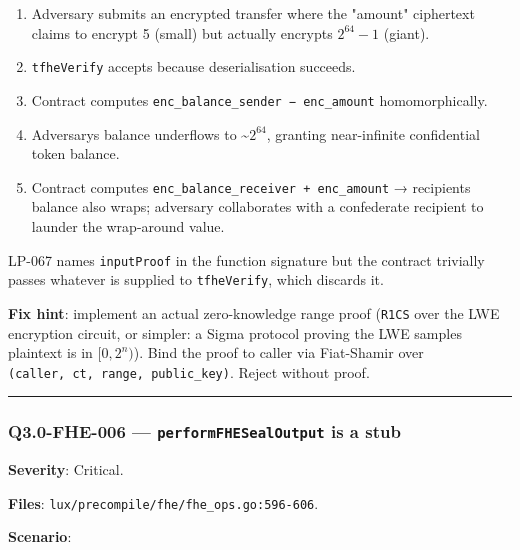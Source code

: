 \documentclass[
]{article}
\providecommand{\tightlist}{%
  \setlength{\itemsep}{0pt}\setlength{\parskip}{0pt}}
\begin{document}
\begin{enumerate}
\def\labelenumi{\arabic{enumi}.}
\tightlist
\item
  Adversary submits an encrypted transfer where the "amount" ciphertext
  claims to encrypt 5 (small) but actually encrypts \(2^{64}-1\)
  (giant).
\item
  \texttt{tfheVerify} accepts because deserialisation succeeds.
\item
  Contract computes \texttt{enc\_balance\_sender\ −\ enc\_amount}
  homomorphically.
\item
  Adversary\textquotesingle s balance underflows to
  \textasciitilde{}\(2^{64}\), granting near-infinite confidential token
  balance.
\item
  Contract computes \texttt{enc\_balance\_receiver\ +\ enc\_amount} →
  recipient\textquotesingle s balance also wraps; adversary collaborates
  with a confederate recipient to launder the wrap-around value.
\end{enumerate}

LP-067 names \texttt{inputProof} in the function signature but the
contract trivially passes whatever is supplied to \texttt{tfheVerify},
which discards it.

\textbf{Fix hint}: implement an actual zero-knowledge range proof
(\texttt{R1CS} over the LWE encryption circuit, or simpler: a Sigma
protocol proving the LWE sample\textquotesingle s plaintext is in
\([0, 2^{n})\)). Bind the proof to caller via Fiat-Shamir over
\texttt{(caller,\ ct,\ range,\ public\_key)}. Reject without proof.

\begin{center}\rule{0.5\linewidth}{0.5pt}\end{center}

\subsubsection{\texorpdfstring{Q3.0-FHE-006 ---
\texttt{performFHESealOutput} is a
stub}{Q3.0-FHE-006 --- performFHESealOutput is a stub}}\label{q30-fhe-006--performfhesealoutput-is-a-stub}

\textbf{Severity}: Critical.

\textbf{Files}: \texttt{lux/precompile/fhe/fhe\_ops.go:596-606}.

\textbf{Scenario}:
\end{document}
